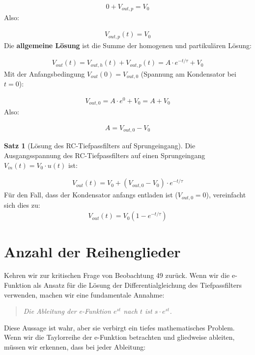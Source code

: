 \documentclass[a4paper, 12pt, twoside, openright]{report}
\theoremstyle{definition}
\theoremstyle{definition}
\newtheorem{satz}{Satz}[chapter]
\begin{document}
\begin{align}
	0 + V_{out,p} = V_0
\end{align}
Also:

\begin{align}
	V_{out,p}(t) = V_0
\end{align}
Die \textbf{allgemeine Lösung} ist die Summe der homogenen und partikulären Lösung:

\begin{align}
	V_{out}(t) = V_{out,h}(t) + V_{out,p}(t) = A \cdot e^{-t/\tau} + V_0
\end{align}
Mit der Anfangsbedingung $V_{out}(0) = V_{out,0}$ (Spannung am Kondensator bei $t=0$):

\begin{align}
	V_{out,0} = A \cdot e^0 + V_0 = A + V_0
\end{align}
Also:

\begin{align}
	A = V_{out,0} - V_0
\end{align}

\begin{satz}[Lösung des RC-Tiefpassfilters auf Sprungeingang]
	Die Ausgangsspannung des RC-Tiefpassfilters auf einen Sprungeingang $V_{in}(t) = V_0 \cdot u(t)$ ist:
	
	\begin{align}
		V_{out}(t) = V_0 + (V_{out,0} - V_0) \cdot e^{-t/\tau}
	\end{align}
	Für den Fall, dass der Kondensator anfangs entladen ist ($V_{out,0} = 0$), vereinfacht sich dies zu:
	\begin{align}
		V_{out}(t) = V_0 (1 - e^{-t/\tau})
	\end{align}
\end{satz}

\section{Anzahl der Reihenglieder}

Kehren wir zur kritischen Frage von Beobachtung 49 zurück. Wenn wir die e-Funktion als Ansatz für die Lösung der Differentialgleichung des Tiefpassfilters verwenden, machen wir eine fundamentale Annahme:

\begin{quote}
	\textit{Die Ableitung der e-Funktion $e^{st}$ nach $t$ ist $s \cdot e^{st}$.}
\end{quote}

Diese Aussage ist wahr, aber sie verbirgt ein tiefes mathematisches Problem. Wenn wir die Taylorreihe der e-Funktion betrachten und gliedweise ableiten, müssen wir erkennen, dass bei jeder Ableitung:
\end{document}
